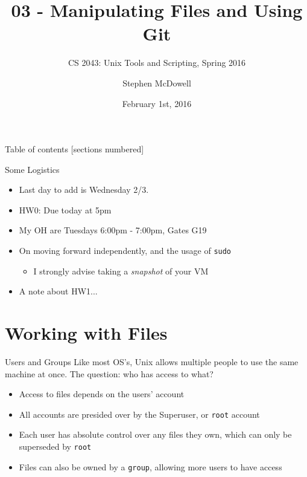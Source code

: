 \documentclass[11pt]{beamer}
\title{03 \-- Manipulating Files and Using Git}
\subtitle{CS 2043: Unix Tools and Scripting, Spring 2016 \cite{prevSemesters}}
\date{February 1st, 2016}
\author{Stephen McDowell}
\institute{Cornell University}
\newcommand{\colbf}[1]{\textcolor{mLightBrown!77!black}{#1}}%
\begin{document}
\maketitle

\begin{frame}{Table of contents}
  [sections numbered]
  \tableofcontents[hideallsubsections]
\end{frame}

\begin{frame}{Some Logistics}
  \begin{itemize}[<+- | alert@+>]
    \item Last day to add is Wednesday 2/3.
    \item HW0: Due today at 5pm
    \item My OH are Tuesdays 6:00pm - 7:00pm, Gates G19
    \item On moving forward independently, and the usage of \texttt{sudo}
    \begin{itemize}[<+- | alert@+>]
      \item I strongly advise taking a \emph{snapshot} of your VM
    \end{itemize}
    \item A note about HW1...
  \end{itemize}
\end{frame}

%
\section{Working with Files}
\label{sec:working_with_files}

\begin{frame}[fragile]{Users and Groups}
  Like most OS's, Unix allows multiple people to use the same machine at once.  The question: who has access
  to what?

  \begin{itemize}[<+- | alert@+>]
    \item Access to files depends on the users' account
    \item All accounts are presided over by the \colbf{S}uper\colbf{u}ser, or \texttt{root} account
    \item Each user has absolute control over any files they own, which can only be superseded by \texttt{root}
    \item Files can also be owned by a \texttt{group}, allowing more users to have access
  \end{itemize}
\end{frame}
\end{document}
